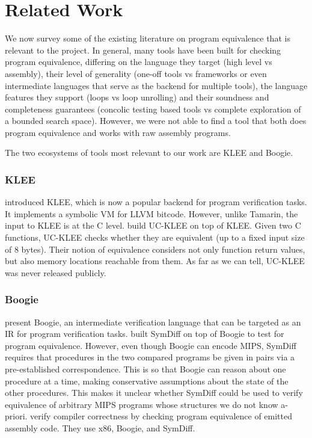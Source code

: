 \documentclass{llncs}
\begin{document}
\section{Related Work}
We now survey some of the existing literature on program equivalence that is relevant to the project. In general, many tools have been built for checking program equivalence, differing on the language they target (high level vs assembly), their level of generality (one-off tools vs frameworks or even intermediate languages that serve as the backend for multiple tools), the language features they support (loops vs loop unrolling) and their soundness and completeness guarantees (concolic testing based tools vs complete exploration of a bounded search space). However, we were not able to find a tool that both does program equivalence and works with raw assembly programs.

The two ecosystems of tools most relevant to our work are KLEE and Boogie.

\subsubsection{KLEE}

\cite{cadar2008klee}  introduced KLEE, which is now a popular backend for program verification tasks. It implements a symbolic VM for LLVM bitcode. However, unlike Tamarin, the input to KLEE is at the C level. \cite{ramos2011practical} build UC-KLEE on top of KLEE. Given two C functions, UC-KLEE checks whether they are equivalent (up to a fixed input size of 8 bytes). Their notion of equivalence considers not only function return values, but also memory locations reachable from them. As far as we can tell, UC-KLEE was never released publicly.

\subsubsection{Boogie}

\cite{barnett2005boogie} present Boogie, an intermediate verification language that can be targeted as an IR for program verification tasks. \cite{lahiri2012symdiff} built SymDiff on top of Boogie to test for program equivalence. However, even though Boogie can encode MIPS, SymDiff requires that procedures in the two compared programs be given in pairs via a pre-established correspondence. This is so that Boogie can reason about one procedure at a time, making conservative assumptions about the state of the other procedures. This makes it unclear whether SymDiff could be used to verify equivalence of arbitrary MIPS programs whose structures we do not know a-priori. \cite{hawblitzel2013will} verify compiler correctness by checking program equivalence of emitted assembly code. They use x86, Boogie, and SymDiff.
\end{document}
